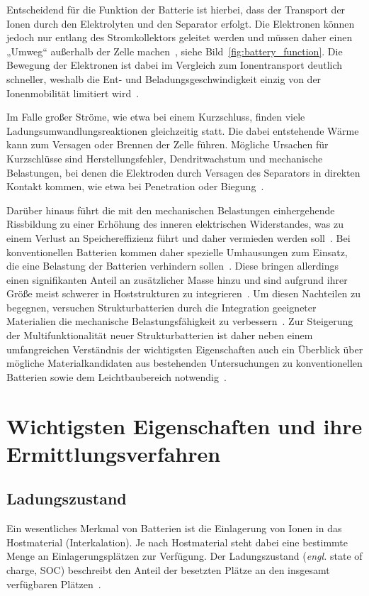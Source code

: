 Entscheidend für die Funktion der Batterie ist hierbei, dass der Transport der Ionen durch den Elektrolyten und den Separator erfolgt. Die Elektronen können jedoch nur entlang des Stromkollektors geleitet werden und müssen daher einen „Umweg“ außerhalb der Zelle machen~\cite{Plett2015}, siehe Bild~\ref{fig:battery_function}. Die Bewegung der Elektronen ist dabei im Vergleich zum Ionentransport deutlich schneller, weshalb die Ent- und Beladungsgeschwindigkeit einzig von der Ionenmobilität limitiert wird~\cite{Plett2024}.

Im Falle großer Ströme, wie etwa bei einem Kurzschluss, finden viele Ladungsumwandlungsreaktionen gleichzeitig statt. Die dabei entstehende Wärme kann zum Versagen oder Brennen der Zelle führen. Mögliche Ursachen für Kurzschlüsse sind Herstellungsfehler, Dendritwachstum und mechanische Belastungen, bei denen die Elektroden durch Versagen des Separators in direkten Kontakt kommen, wie etwa bei Penetration oder Biegung~\cite{Beard2019}.

Darüber hinaus führt die mit den mechanischen Belastungen einhergehende Rissbildung zu einer Erhöhung des inneren elektrischen Widerstandes, was zu einem Verlust an Speichereffizienz führt und daher vermieden werden soll~\cite{Plett2024}. Bei konventionellen Batterien kommen daher spezielle Umhausungen zum Einsatz, die eine Belastung der Batterien verhindern sollen~\cite{Beard2019}. Diese bringen allerdings einen signifikanten Anteil an zusätzlicher Masse hinzu und sind aufgrund ihrer Größe meist schwerer in Hoststrukturen zu integrieren~\cite{Asp2021}. Um diesen Nachteilen zu begegnen, versuchen Strukturbatterien durch die Integration geeigneter Materialien die mechanische Belastungsfähigkeit zu verbessern~\cite{Carlstedt2018}. Zur Steigerung der Multifunktionalität neuer Strukturbatterien ist daher neben einem umfangreichen Verständnis der wichtigsten Eigenschaften auch ein Überblick über mögliche Materialkandidaten aus bestehenden Untersuchungen zu konventionellen Batterien sowie dem Leichtbaubereich notwendig~\cite{Asp2019}.


\section{Wichtigsten Eigenschaften und ihre Ermittlungsverfahren}
\subsection{Ladungszustand}
Ein wesentliches Merkmal von Batterien ist die Einlagerung von Ionen in das Hostmaterial (Interkalation). Je nach Hostmaterial steht dabei eine bestimmte Menge an Einlagerungsplätzen zur Verfügung. Der Ladungszustand (\textit{engl.} state of charge, SOC) beschreibt den Anteil der besetzten Plätze an den insgesamt verfügbaren Plätzen~\cite{Plett2015}.

